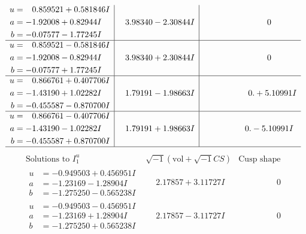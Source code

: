 \documentclass[1p]{elsarticle_modified}
\theoremstyle{definition}
\newcommand{\I}{\sqrt{-1}}
\begin{document}
$$\begin{array}{c|c|c}
\begin{aligned}
u &= \phantom{-}0.859521 + 0.581846 I \\
a &= -1.92008 + 0.82944 I \\
b &= -0.07577 - 1.77245 I\end{aligned}
 & \phantom{-}3.98340 - 2.30844 I & \phantom{-0.000000 } 0 \\ \hline\begin{aligned}
u &= \phantom{-}0.859521 - 0.581846 I \\
a &= -1.92008 - 0.82944 I \\
b &= -0.07577 + 1.77245 I\end{aligned}
 & \phantom{-}3.98340 + 2.30844 I & \phantom{-0.000000 } 0 \\ \hline\begin{aligned}
u &= \phantom{-}0.866761 + 0.407706 I \\
a &= -1.43190 + 1.02282 I \\
b &= -0.455587 - 0.870700 I\end{aligned}
 & \phantom{-}1.79191 - 1.98663 I & \phantom{-0.000000 -}0. + 5.10991 I \\ \hline\begin{aligned}
u &= \phantom{-}0.866761 - 0.407706 I \\
a &= -1.43190 - 1.02282 I \\
b &= -0.455587 + 0.870700 I\end{aligned}
 & \phantom{-}1.79191 + 1.98663 I & \phantom{-0.000000 } 0. - 5.10991 I\\
 \hline 
 \end{array}$$\newpage$$\begin{array}{c|c|c}  
\text{Solutions to }I^u_{1}& \I (\text{vol} + \sqrt{-1}CS) & \text{Cusp shape}\\
 \hline 
\begin{aligned}
u &= -0.949503 + 0.456951 I \\
a &= -1.23169 - 1.28904 I \\
b &= -1.275250 - 0.565238 I\end{aligned}
 & \phantom{-}2.17857 + 3.11727 I & \phantom{-0.000000 } 0 \\ \hline\begin{aligned}
u &= -0.949503 - 0.456951 I \\
a &= -1.23169 + 1.28904 I \\
b &= -1.275250 + 0.565238 I\end{aligned}
 & \phantom{-}2.17857 - 3.11727 I & \phantom{-0.000000 } 0 \\ \hline\begin{aligned}

\end{aligned}
\end{array}$$
\end{document}
